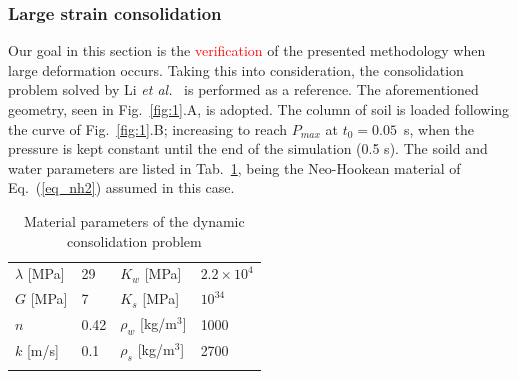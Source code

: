 \documentclass[twocolumn]{svjour3}          %
\begin{document}
\subsubsection{Large strain consolidation}
\label{sec:5:1:1}

Our goal in this section is the \textcolor{red}{verification} of the presented methodology when large deformation occurs. Taking this into consideration, the consolidation problem solved by Li \textit{et al.}~\cite{LiBorja2004}  is performed as a reference. The aforementioned geometry, seen in Fig.~\ref{fig:1}.A, is adopted. The column of soil is loaded following the curve of Fig.~\ref{fig:1}.B; increasing to reach $P_{max}$ at $t_0=0.05$~s, when the pressure is kept constant until the end of the simulation (0.5 s). The soild and water parameters are listed in Tab.~\ref{tab:4}, being the Neo-Hookean material of Eq.~(\ref{eq_nh2}) assumed in this case. 
\begin{table}
\centering
\caption{ Material parameters of the dynamic consolidation problem} \label{tab:4}
	\vspace*{0.2cm}
	\begin{tabular}{ll | ll}
	\hline\noalign{\smallskip}
	$\lambda$ [MPa] & 29 & $K_w$ [MPa] & $2.2 \times 10^4$ \\
		\noalign{\smallskip}\hline\noalign{\smallskip}
	$G$ [MPa] & 7 & $K_s$ [MPa] & $10^{34}$ \\
			\noalign{\smallskip}\hline\noalign{\smallskip}
	$n$ & 0.42 & $\rho_w$ [kg/$\textrm{m}^3$] & 1000 \\
				\noalign{\smallskip}\hline\noalign{\smallskip}
	$k$ [m/s] & 0.1 & $\rho_s$ [kg/$\textrm{m}^3$] & 2700 \\
\hline\noalign{\smallskip}
	\end{tabular}
\end{table}
\end{document}

